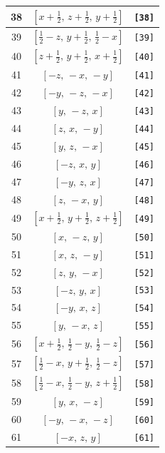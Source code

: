 \documentclass[fleqn,8pt]{jsarticle}
\begin{document}
\begin{longtable}{ccc}
38 & $\left[ x + \frac{1}{2},\, z + \frac{1}{2},\, y + \frac{1}{2} \right]$ & {\tt [38]} \\ \hline
39 & $\left[ \frac{1}{2} - z,\, y + \frac{1}{2},\, \frac{1}{2} - x \right]$ & {\tt [39]} \\ \hline
40 & $\left[ z + \frac{1}{2},\, y + \frac{1}{2},\, x + \frac{1}{2} \right]$ & {\tt [40]} \\ \hline
41 & $\left[ - z,\, - x,\, - y \right]$ & {\tt [41]} \\ \hline
42 & $\left[ - y,\, - z,\, - x \right]$ & {\tt [42]} \\ \hline
43 & $\left[ y,\, - z,\, x \right]$ & {\tt [43]} \\ \hline
44 & $\left[ z,\, x,\, - y \right]$ & {\tt [44]} \\ \hline
45 & $\left[ y,\, z,\, - x \right]$ & {\tt [45]} \\ \hline
46 & $\left[ - z,\, x,\, y \right]$ & {\tt [46]} \\ \hline
47 & $\left[ - y,\, z,\, x \right]$ & {\tt [47]} \\ \hline
48 & $\left[ z,\, - x,\, y \right]$ & {\tt [48]} \\ \hline
49 & $\left[ x + \frac{1}{2},\, y + \frac{1}{2},\, z + \frac{1}{2} \right]$ & {\tt [49]} \\ \hline
50 & $\left[ x,\, - z,\, y \right]$ & {\tt [50]} \\ \hline
51 & $\left[ x,\, z,\, - y \right]$ & {\tt [51]} \\ \hline
52 & $\left[ z,\, y,\, - x \right]$ & {\tt [52]} \\ \hline
53 & $\left[ - z,\, y,\, x \right]$ & {\tt [53]} \\ \hline
54 & $\left[ - y,\, x,\, z \right]$ & {\tt [54]} \\ \hline
55 & $\left[ y,\, - x,\, z \right]$ & {\tt [55]} \\ \hline
56 & $\left[ x + \frac{1}{2},\, \frac{1}{2} - y,\, \frac{1}{2} - z \right]$ & {\tt [56]} \\ \hline
57 & $\left[ \frac{1}{2} - x,\, y + \frac{1}{2},\, \frac{1}{2} - z \right]$ & {\tt [57]} \\ \hline
58 & $\left[ \frac{1}{2} - x,\, \frac{1}{2} - y,\, z + \frac{1}{2} \right]$ & {\tt [58]} \\ \hline
59 & $\left[ y,\, x,\, - z \right]$ & {\tt [59]} \\ \hline
60 & $\left[ - y,\, - x,\, - z \right]$ & {\tt [60]} \\ \hline
61 & $\left[ - x,\, z,\, y \right]$ & {\tt [61]} \\ \hline

\end{longtable}
\end{document}
